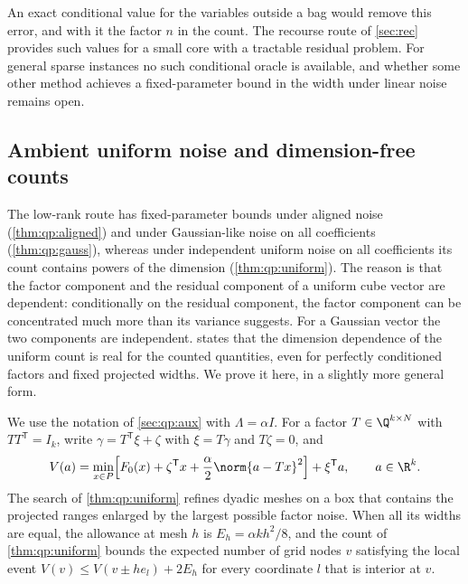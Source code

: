 An exact conditional value for the variables outside a bag would remove this
error, and with it the factor $n$ in the count. The recourse route of
\cref{sec:rec} provides such values for a small core with a tractable
residual problem. For general sparse instances no such conditional oracle is
available, and whether some other method achieves a fixed-parameter bound in
the width under linear noise remains open.

\subsection{Ambient uniform noise and dimension-free counts}\label{sec:lim:ambient}

The low-rank route has fixed-parameter bounds under aligned noise
(\cref{thm:qp:aligned}) and under Gaussian-like noise on all coefficients
(\cref{thm:qp:gauss}), whereas under independent uniform noise on all
coefficients its count contains powers of the dimension
(\cref{thm:qp:uniform}). The reason is that the factor component and the
residual component of a uniform cube vector are dependent: conditionally on
the residual component, the factor component can be concentrated much more
than its variance suggests. For a Gaussian vector the two components are
independent.  states that the dimension
dependence of the uniform count is real for the counted quantities, even for
perfectly conditioned factors and fixed projected widths. We prove it here,
in a slightly more general form.

We use the notation of \cref{sec:qp:aux} with $\Lambda=\alpha I$. For a
factor $T\in\Q^{k\times N}$ with $TT^{\mathsf T}=I_k$, write
$\gamma=T^{\mathsf T}\xi+\zeta$ with $\xi=T\gamma$ and $T\zeta=0$, and
\begin{equation}\label{eq:lim:aux}
 V(a)=\min_{x\in P}\Bigl[F_0(x)+\zeta^{\mathsf T}x
 +\frac\alpha2\norm{a-Tx}^2\Bigr]+\xi^{\mathsf T}a,\qquad a\in\R^k .
\end{equation}
The search of \cref{thm:qp:uniform} refines dyadic meshes on a box that
contains the projected ranges enlarged by the largest possible factor
noise. When all its widths are equal, the allowance at mesh $h$ is
$E_h=\alpha kh^2/8$, and the count of \cref{thm:qp:uniform} bounds the
expected number of grid nodes $v$ satisfying the local event
$V(v)\le V(v\pm he_l)+2E_h$ for every coordinate $l$ that is interior at
$v$.

